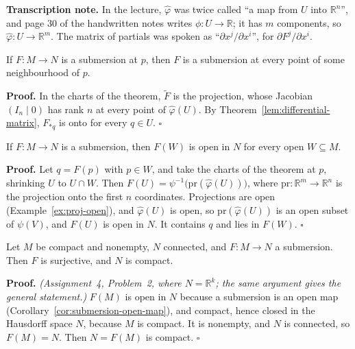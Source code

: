 \documentclass[11pt]{report}
\makeatletter
\newcounter{thmcounter}[section]
\renewenvironment{proof}[1][Proof]{\noindent\textbf{#1.} }{\hfill$\square$\par\vspace{5pt}}
\newcommand{\thmlabel}[1]{\edef\@currentlabel{\arabic{section}.\arabic{thmcounter}}\label{#1}}
\newcommand{\leeref}[1]{\par\smallskip{\raggedleft\footnotesize\textsc{Lee}:\ #1\par}}
\makeatother
\begin{document}
\textbf{Transcription note.} In the lecture, $\hat\varphi$ was twice called ``a map from $U$ into $\mathbb{R}^n$'', and page 30 of the handwritten notes writes $\phi : U \to \mathbb{R}$; it has $m$ components, so $\hat\varphi : U \to \mathbb{R}^m$. The matrix of partials was spoken as ``$\partial x^j/\partial x^i$'', for $\partial F^j/\partial x^i$.

\begin{corbox}\thmlabel{cor:submersion-open-condition}
If $F : M \to N$ is a submersion at $p$, then $F$ is a submersion at every point of some neighbourhood of $p$.
\leeref{Proposition 4.1}
\end{corbox}

\begin{proof}
In the charts of the theorem, $\tilde F$ is the projection, whose Jacobian $(I_n \mid 0)$ has rank $n$ at every point of $\hat\varphi(U)$. By Theorem~\ref{lem:differential-matrix}, $F_{*q}$ is onto for every $q \in U$.
\end{proof}

\begin{corbox}\thmlabel{cor:submersion-open-map}
If $F : M \to N$ is a submersion, then $F(W)$ is open in $N$ for every open $W \subseteq M$.
\leeref{Proposition 4.28}
\end{corbox}

\begin{proof}
Let $q = F(p)$ with $p \in W$, and take the charts of the theorem at $p$, shrinking $U$ to $U \cap W$. Then $F(U) = \psi^{-1}\big(\mathrm{pr}(\hat\varphi(U))\big)$, where $\mathrm{pr} : \mathbb{R}^m \to \mathbb{R}^n$ is the projection onto the first $n$ coordinates. Projections are open (Example~\ref{ex:proj-open}), and $\hat\varphi(U)$ is open, so $\mathrm{pr}(\hat\varphi(U))$ is an open subset of $\psi(V)$, and $F(U)$ is open in $N$. It contains $q$ and lies in $F(W)$.
\end{proof}

\begin{thmbox}\thmlabel{thm:compact-submersion}
Let $M$ be compact and nonempty, $N$ connected, and $F : M \to N$ a submersion. Then $F$ is surjective, and $N$ is compact.
\end{thmbox}

\begin{proof}
\textit{(Assignment~4, Problem~2, where $N = \mathbb{R}^k$; the same argument gives the general statement.)} $F(M)$ is open in $N$ because a submersion is an open map (Corollary~\ref{cor:submersion-open-map}), and compact, hence closed in the Hausdorff space $N$, because $M$ is compact. It is nonempty, and $N$ is connected, so $F(M) = N$. Then $N = F(M)$ is compact.
\end{proof}
\end{document}
